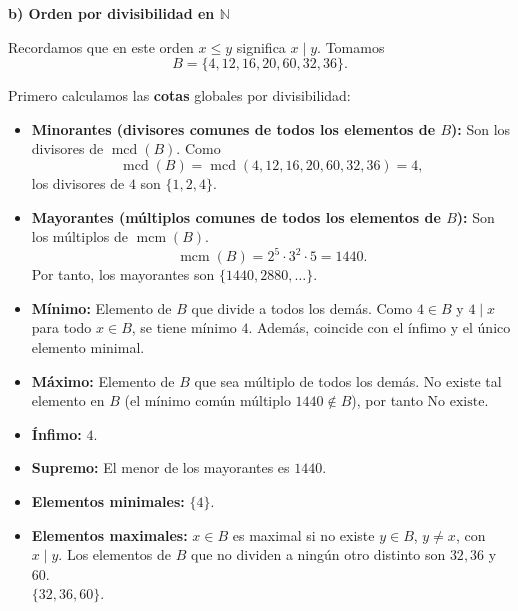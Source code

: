 \documentclass[a4paper,12pt]{article}
\begin{document}
\begin{ejercicio}[title=Ejercicio 17]

\textbf{b) Orden por divisibilidad en \(\mathbb{N}\)}

Recordamos que en este orden \(x \le y\) significa \(x \mid y\). Tomamos
\[
B = \{4,12,16,20,60,32,36\}.
\]

Primero calculamos las \textbf{cotas} globales por divisibilidad:

\begin{itemize}
  \item \textbf{Minorantes (divisores comunes de todos los elementos de \(B\)):}  
  Son los divisores de \(\operatorname{mcd}(B)\). Como
  \[
  \operatorname{mcd}(B) = \operatorname{mcd}(4,12,16,20,60,32,36) = 4,
  \]
  los divisores de \(4\) son \(\boxed{\{1,2,4\}}\).

  \item \textbf{Mayorantes (múltiplos comunes de todos los elementos de \(B\)):}  
  Son los múltiplos de \(\operatorname{mcm}(B)\).
  \[
  \operatorname{mcm}(B) = 2^5 \cdot 3^2 \cdot 5 = 1440.
  \]
  Por tanto, los mayorantes son \(\boxed{\{1440, 2880, \dots\}}\).

  \item \textbf{Mínimo:}  
  Elemento de \(B\) que divide a todos los demás. Como \(4 \in B\) y \(4 \mid x\) para todo \(x \in B\), se tiene mínimo \(\boxed{4}\).  
  Además, coincide con el ínfimo y el único elemento minimal.

  \item \textbf{Máximo:}  
  Elemento de \(B\) que sea múltiplo de todos los demás. No existe tal elemento en \(B\) (el mínimo común múltiplo \(1440 \notin B\)), por tanto \(\boxed{\text{No existe}}\).

  \item \textbf{Ínfimo:}  
  \(\boxed{4}\).

  \item \textbf{Supremo:}  
  El menor de los mayorantes es \(\boxed{1440}\).

  \item \textbf{Elementos minimales:}  
  \(\boxed{\{4\}}\).

  \item \textbf{Elementos maximales:}  
  \(x \in B\) es maximal si no existe \(y \in B\), \(y \neq x\), con \(x \mid y\).  
  Los elementos de \(B\) que no dividen a ningún otro distinto son \(32, 36\) y \(60\).\\
  \(\boxed{\{32,36,60\}}\).
\end{itemize}

\end{ejercicio}
\end{document}
